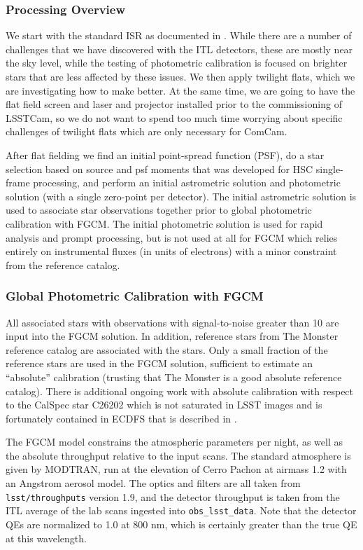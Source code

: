 \subsubsection{Processing Overview}

We start with the standard ISR as documented in . While
there are a number of challenges that we have discovered with the ITL
detectors, these are mostly near the sky level, while the testing of
photometric calibration is focused on brighter stars that are less affected by
these issues. We then apply twilight flats, which we are investigating how to
make better. At the same time, we are going to have the flat field screen and
laser and projector installed prior to the commissioning of LSSTCam, so we do
not want to spend too much time worrying about specific challenges of twilight
flats which are only necessary for ComCam.

After flat fielding we find an initial point-spread function (PSF), do a star
selection based on source and psf moments that was developed for HSC
single-frame processing, and perform an initial astrometric solution and
photometric solution (with a single zero-point per detector).  The initial
astrometric solution is used to associate star observations together prior to
global photometric calibration with FGCM.  The initial photometric solution is
used for rapid analysis and prompt processing, but is not used at all for FGCM
which relies entirely on instrumental fluxes (in units of electrons) with a
minor constraint from the reference catalog.

\subsubsection{Global Photometric Calibration with FGCM}

All associated stars with observations with signal-to-noise greater than 10 are
input into the FGCM solution.  In addition, reference stars from The Monster
reference catalog are associated with the stars.  Only a small fraction of the
reference stars are used in the FGCM solution, sufficient to estimate an
``absolute'' calibration (trusting that The Monster is a good absolute
reference catalog).  There is additional ongoing work with absolute calibration
with respect to the CalSpec star C26202 which is not saturated in LSST images
and is fortunately contained in ECDFS that is described in .

The FGCM model constrains the atmospheric parameters per night, as well as the
absolute throughput relative to the input scans.  The standard atmosphere is
given by MODTRAN, run at the elevation of Cerro Pachon at airmass 1.2 with an
Angstrom aerosol model.  The optics and filters are all taken from
\texttt{lsst/throughputs} version 1.9, and the detector throughput is taken from the
ITL average of the lab scans ingested into \texttt{obs\_lsst\_data}.  Note that the
detector QEs are normalized to 1.0 at 800 nm, which is certainly
greater than the true QE at this wavelength.

